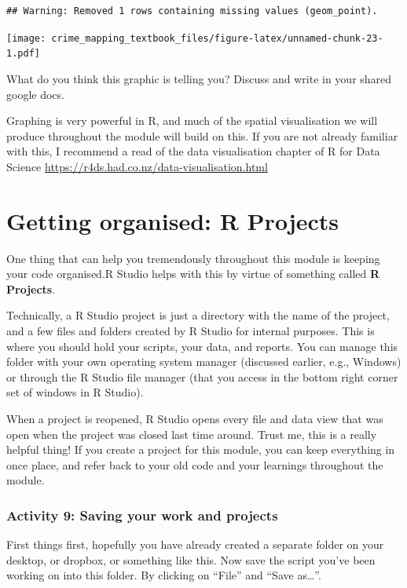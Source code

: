 \documentclass[
]{book}
\begin{document}
\begin{verbatim}
## Warning: Removed 1 rows containing missing values (geom_point).
\end{verbatim}

\texttt{[image: crime\_mapping\_textbook\_files/figure-latex/unnamed-chunk-23-1.pdf]}

What do you think this graphic is telling you? Discuss and write in your shared google docs.

Graphing is very powerful in R, and much of the spatial visualisation we will produce throughout the module will build on this. If you are not already familiar with this, I recommend a read of the data visualisation chapter of R for Data Science \url{https://r4ds.had.co.nz/data-visualisation.html}

\hypertarget{getting-organised-r-projects}{%
\section{Getting organised: R Projects}\label{getting-organised-r-projects}}

One thing that can help you tremendously throughout this module is keeping your code organised.R Studio helps with this by virtue of something called \textbf{R Projects}.

Technically, a R Studio project is just a directory with the name of the project, and a few files and folders created by R Studio for internal purposes. This is where you should hold your scripts, your data, and reports. You can manage this folder with your own operating system manager (discussed earlier, e.g., Windows) or through the R Studio file manager (that you access in the bottom right corner set of windows in R Studio).

When a project is reopened, R Studio opens every file and data view that was open when the project was closed last time around. Trust me, this is a really helpful thing! If you create a project for this module, you can keep everything in once place, and refer back to your old code and your learnings throughout the module.

\hypertarget{activity-9-saving-your-work-and-projects}{%
\subsubsection{Activity 9: Saving your work and projects}\label{activity-9-saving-your-work-and-projects}}

First things first, hopefully you have already created a separate folder on your desktop, or dropbox, or something like this. Now save the script you've been working on into this folder. By clicking on ``File'' and ``Save as\ldots{}''.
\end{document}
